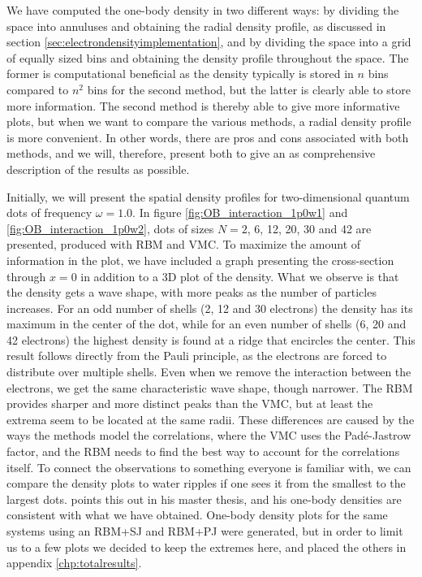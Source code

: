 We have computed the one-body density in two different ways: by dividing the space into annuluses and obtaining the radial density profile, as discussed in section \ref{sec:electrondensityimplementation}, and by dividing the space into a grid of equally sized bins and obtaining the density profile throughout the space. The former is computational beneficial as the density typically is stored in $n$ bins compared to $n^2$ bins for the second method, but the latter is clearly able to store more information. The second method is thereby able to give more informative plots, but when we want to compare the various methods, a radial density profile is more convenient. In other words, there are pros and cons associated with both methods, and we will, therefore, present both to give an as comprehensive description of the results as possible. 

Initially, we will present the spatial density profiles for two-dimensional quantum dots of frequency $\omega=1.0$. In figure \eqref{fig:OB_interaction_1p0w1} and \eqref{fig:OB_interaction_1p0w2}, dots of sizes $N=2$, 6, 12, 20, 30 and 42 are presented, produced with RBM and VMC. To maximize the amount of information in the plot, we have included a graph presenting the cross-section through $x=0$ in addition to a 3D plot of the density. What we observe is that the density gets a wave shape, with more peaks as the number of particles increases. For an odd number of shells (2, 12 and 30 electrons) the density has its maximum in the center of the dot, while for an even number of shells (6, 20 and 42 electrons) the highest density is found at a ridge that encircles the center. This result follows directly from the Pauli principle, as the electrons are forced to distribute over multiple shells. Even when we remove the interaction between the electrons, we get the same characteristic wave shape, though narrower. The RBM provides sharper and more distinct peaks than the VMC, but at least the extrema seem to be located at the same radii. These differences are caused by the ways the methods model the correlations, where the VMC uses the Padé-Jastrow factor, and the RBM needs to find the best way to account for the correlations itself. To connect the observations to something everyone is familiar with, we can compare the density plots to water ripples if one sees it from the smallest to the largest dots. \citet{hogberget_quantum_2013} points this out in his master thesis, and his one-body densities are consistent with what we have obtained. One-body density plots for the same systems using an RBM+SJ and RBM+PJ were generated, but in order to limit us to a few plots we decided to keep the extremes here, and placed the others in appendix \ref{chp:totalresults}.

